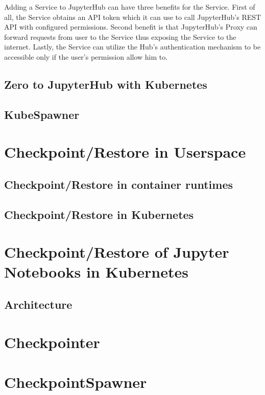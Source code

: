 \documentclass[
  digital,     %
  oneside,     %
  nosansbold,  %
  nocolorbold, %
  lof,         %
  lot,         %
]{fithesis4}
\begin{document}
Adding a Service to JupyterHub can have three benefits for the Service. First of all, the Service obtains an API token which it can use to call JupyterHub's REST API with configured permissions. Second benefit is that JupyterHub's Proxy can forward requests from user to the Service thus exposing the Service to the internet. Lastly, the Service can utilize the Hub's authentication mechanism to be accessible only if the user's permission allow him to.


\section{Zero to JupyterHub with Kubernetes}
\label{sec:z2jh}




\section{KubeSpawner}
\label{sec:kubespawner}




\chapter{Checkpoint/Restore in Userspace}

\section{Checkpoint/Restore in container runtimes}

\section{Checkpoint/Restore in Kubernetes}

\chapter{Checkpoint/Restore of Jupyter Notebooks in Kubernetes}

\section{Architecture}

\chapter{Checkpointer}
\label{chap:checkpointer}

\chapter{CheckpointSpawner}
\label{chap:checkpoint_spawner}
\end{document}
